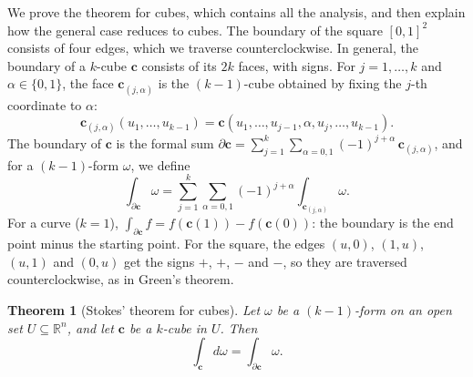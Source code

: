 \documentclass[11pt]{article}
\theoremstyle{definition}
\theoremstyle{plain}
\newtheorem{theorem}[definition]{Theorem}
\theoremstyle{remark}
\begin{document}
We prove the theorem for cubes, which contains all the analysis, and then explain how the general case reduces to cubes. The boundary of the square $[0, 1]^2$ consists of four edges, which we traverse counterclockwise. In general, the boundary of a $k$-cube $\mathbf{c}$ consists of its $2k$ faces, with signs. For $j = 1, \ldots, k$ and $\alpha \in \{0, 1\}$, the face $\mathbf{c}_{(j, \alpha)}$ is the $(k - 1)$-cube obtained by fixing the $j$-th coordinate to $\alpha$:
\[\mathbf{c}_{(j, \alpha)}(u_1, \ldots, u_{k-1}) = \mathbf{c}(u_1, \ldots, u_{j-1}, \alpha, u_j, \ldots, u_{k-1}).\]
The boundary of $\mathbf{c}$ is the formal sum $\partial\mathbf{c} = \sum_{j=1}^k \sum_{\alpha = 0, 1} (-1)^{j+\alpha}\, \mathbf{c}_{(j, \alpha)}$, and for a $(k - 1)$-form $\omega$, we define
\[\int_{\partial\mathbf{c}} \omega = \sum_{j=1}^k \sum_{\alpha = 0, 1} (-1)^{j+\alpha} \int_{\mathbf{c}_{(j, \alpha)}} \omega.\]
For a curve ($k = 1$), $\int_{\partial\mathbf{c}} f = f(\mathbf{c}(1)) - f(\mathbf{c}(0))$: the boundary is the end point minus the starting point. For the square, the edges $(u, 0)$, $(1, u)$, $(u, 1)$ and $(0, u)$ get the signs $+$, $+$, $-$ and $-$, so they are traversed counterclockwise, as in Green's theorem.

\begin{theorem}[Stokes' theorem for cubes]\label{thm:stokes-cube}
    Let $\omega$ be a $(k - 1)$-form on an open set $U \subseteq \mathbb{R}^n$, and let $\mathbf{c}$ be a $k$-cube in $U$. Then
    \[\int_{\mathbf{c}} d\omega = \int_{\partial\mathbf{c}} \omega.\]
\end{theorem}
\end{document}
